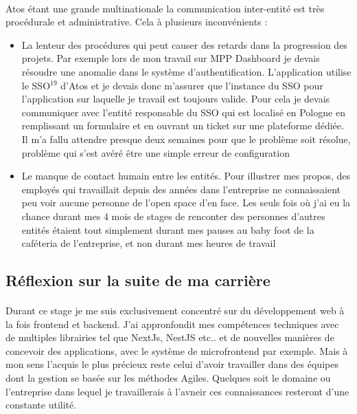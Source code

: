 \documentclass[12pt]{article}
\begin{document}
\begin {sloppypar}
\paragraph{}
Atos étant une grande multinationale la communication inter-entité est très procédurale et 
administrative. Cela à plusieurs inconvénients : 
\begin{itemize}
  \item 
    La lenteur des procédures qui peut causer des retards dans la progression des projets. Par exemple lors de mon travail 
    sur MPP Dashboard je devais résoudre une anomalie dans le système d'authentification. L'application utilise 
    le SSO$^{19}$ d'Atos et je devais donc m'assurer que l'instance du SSO pour l'application sur laquelle je travail 
    est toujours valide. Pour cela je devais communiquer avec l'entité responsable du SSO qui est localisé en Pologne 
    en remplissant un formulaire et en ouvrant un ticket sur une plateforme dédiée. Il m'a fallu attendre presque 
    deux semaines pour que le problème soit résolue, problème qui s'est avéré être une simple erreur de configuration
  \item 
    Le manque de contact humain entre les entités. Pour illustrer mes propos, des employés qui travaillait depuis
    des années dans l'entreprise ne connaissaient peu voir aucune personne de l'open space d'en face. Les 
    seuls fois où j'ai eu la chance durant mes 4 mois de stages de renconter des personnes d'autres entités étaient
    tout simplement durant mes pauses au baby foot de la caféteria de l'entreprise, et non durant mes heures de travail
\end{itemize}
\newpage
\subsection{Réflexion sur la suite de ma carrière}
\paragraph{}
Durant ce stage je me suis exclusivement concentré sur du développement web à la fois frontend
et backend. J'ai appronfondit mes compétences techniques avec de multiples librairies tel que NextJs,
NestJS etc.. et de nouvelles manières de concevoir des applications, avec le système de microfrontend
par exemple. Mais à mon sens l'acquis le plus précieux reste celui d'avoir travailler dans des équipes
dont la gestion se basée sur les méthodes Agiles. Quelques soit le domaine ou l'entreprise dans lequel je travaillerais 
à l'avneir ces connaissances resteront d'une constante utilité.


\end{sloppypar}
\end{document}
